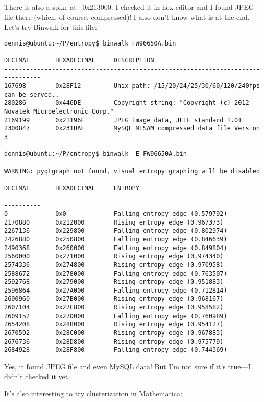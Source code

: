 There is also a spike at ~0x213000. I checked it in hex editor and I found JPEG file there 
(which, of course, compressed)!
I also don't know what is at the end.
Let's try Binwalk for this file:

\begin{lstlisting}
dennis@ubuntu:~/P/entropy$ binwalk FW96650A.bin 

DECIMAL       HEXADECIMAL     DESCRIPTION
--------------------------------------------------------------------------------
167698        0x28F12         Unix path: /15/20/24/25/30/60/120/240fps can be served..
280286        0x446DE         Copyright string: "Copyright (c) 2012 Novatek Microelectronic Corp."
2169199       0x21196F        JPEG image data, JFIF standard 1.01
2300847       0x231BAF        MySQL MISAM compressed data file Version 3

dennis@ubuntu:~/P/entropy$ binwalk -E FW96650A.bin 

WARNING: pyqtgraph not found, visual entropy graphing will be disabled

DECIMAL       HEXADECIMAL     ENTROPY
--------------------------------------------------------------------------------
0             0x0             Falling entropy edge (0.579792)
2170880       0x212000        Rising entropy edge (0.967373)
2267136       0x229800        Falling entropy edge (0.802974)
2426880       0x250800        Falling entropy edge (0.846639)
2490368       0x260000        Falling entropy edge (0.849804)
2560000       0x271000        Rising entropy edge (0.974340)
2574336       0x274800        Rising entropy edge (0.970958)
2588672       0x278000        Falling entropy edge (0.763507)
2592768       0x279000        Rising entropy edge (0.951883)
2596864       0x27A000        Falling entropy edge (0.712814)
2600960       0x27B000        Rising entropy edge (0.968167)
2607104       0x27C800        Rising entropy edge (0.958582)
2609152       0x27D000        Falling entropy edge (0.760989)
2654208       0x288000        Rising entropy edge (0.954127)
2670592       0x28C000        Rising entropy edge (0.967883)
2676736       0x28D800        Rising entropy edge (0.975779)
2684928       0x28F800        Falling entropy edge (0.744369)
\end{lstlisting}

Yes, it found JPEG file and even MySQL data!
But I'm not sure if it's true---I didn't checked it yet.

It's also interesting to try clusterization in Mathematica:

